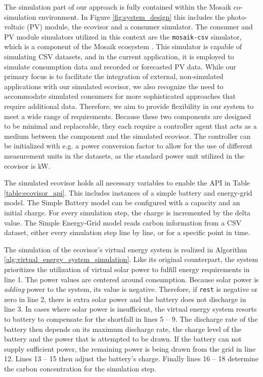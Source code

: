 The simulation part of our approach is fully contained within the Mosaik
co-simulation environment. In Figure \ref{fig:system_design} this includes the
photo-voltaic (PV) module, the ecovisor and a consumer simulator. The consumer
and PV module simulators utilized in this context are the \texttt{mosaik-csv}
simulator, which is a component of the Mosaik ecosystem \cite{mosaik_ecosystem}.
This simulator is capable of simulating CSV datasets, and in the current
application, it is employed to simulate consumption data and recorded or
forecasted PV data. While our primary focus is to facilitate the integration of
external, non-simulated applications with our simulated ecovisor, we also
recognize the need to accommodate simulated consumers for more sophisticated
approaches that require additional data. Therefore, we aim to provide
flexibility in our system to meet a wide range of requirements. Because these
two components are designed to be minimal and replaceable, they each require a
controller agent that acts as a medium between the component and the simulated
ecovisor. The controller can be initialized with e.g. a power conversion factor
to allow for the use of different measurement units in the datasets, as the
standard power unit utilized in the ecovisor is kW.

The simulated ecovisor holds all necessary variables to enable the API in Table
\ref{table:ecovisor_api}. This includes instances of a simple battery and
energy-grid model. The Simple Battery model can be configured with a capacity
and an initial charge. For every simulation step, the charge is incremented by
the delta value. The Simple Energy-Grid model reads carbon information from a
CSV dataset, either every simulation step line by line, or for a specific point
in time.

The simulation of the ecovisor's virtual energy system is realized in Algorithm
\ref{alg:virtual_energy_system_simulation}. Like its original counterpart, the
system prioritizes the utilization of virtual solar power to fulfill energy
requirements in line 1. The power values are centered around consumption.
Because solar power is \emph{adding} power to the system, its value is negative.
Therefore, if \texttt{rest} is negative or zero in line 2, there is extra solar
power and the battery does not discharge in line 3. In cases where solar power
is insufficient, the virtual energy system resorts to battery to compensate for
the shortfall in lines 5 -- 9. The discharge rate of the battery then depends on
its maximum discharge rate, the charge level of the battery and the power that
is attempted to be drawn. If the battery can not supply sufficient power, the
remaining power is being drawn from the grid in line 12. Lines 13 -- 15 then
adjust the battery's charge. Finally lines 16 -- 18 determine the carbon
concentration for the simulation step.

